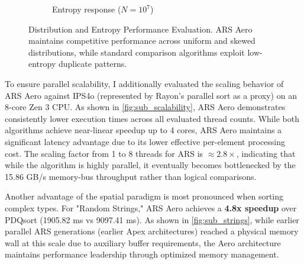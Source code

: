 \begin{figure}[t]
\begin{subfigure}[b]{0.48\textwidth}
\caption{Entropy response ($N=10^7$)}
\label{fig:sub_entropy}
\end{subfigure}
\caption{Distribution and Entropy Performance Evaluation. ARS Aero maintains competitive performance across uniform and skewed distributions, while standard comparison algorithms exploit low-entropy duplicate patterns.}
\label{fig:combined_performance}
\end{figure}

To ensure parallel scalability, I additionally evaluated the scaling behavior of ARS Aero against IPS4o (represented by Rayon's parallel sort as a proxy) on an 8-core Zen 3 CPU.
As shown in \cref{fig:sub_scalability}, ARS Aero demonstrates consistently lower execution times across all evaluated thread counts.
While both algorithms achieve near-linear speedup up to 4 cores, ARS Aero maintains a significant latency advantage due to its lower effective per-element processing cost.
The scaling factor from 1 to 8 threads for ARS is $\approx 2.8\times$, indicating that while the algorithm is highly parallel, it eventually becomes bottlenecked by the 15.86 GB/s memory-bus throughput rather than logical comparisons.

Another advantage of the spatial paradigm is most pronounced when sorting complex types.
For "Random Strings," ARS Aero achieves a \textbf{4.8x speedup} over PDQsort (1905.82 ms vs 9097.41 ms).
As shown in \cref{fig:sub_strings}, while earlier parallel ARS generations (earlier Apex architectures) reached a physical memory wall at this scale due to auxiliary buffer requirements, the Aero architecture maintains performance leadership through optimized memory management.

